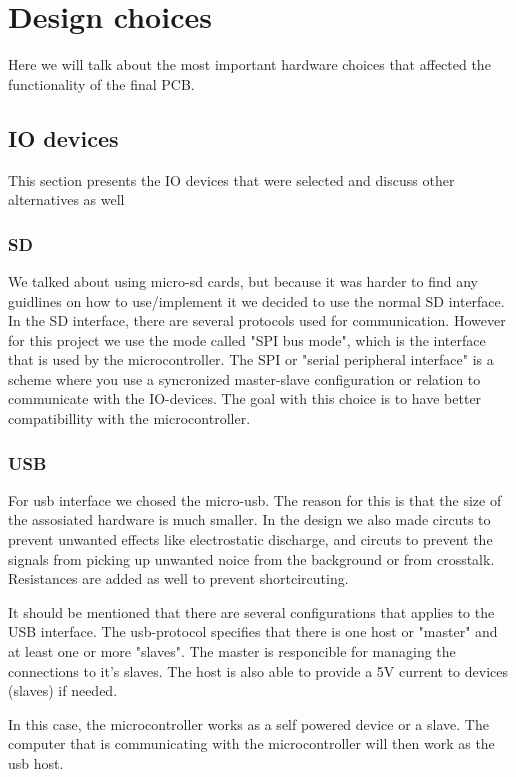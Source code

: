 \section {Design choices}

Here we will talk about the most important hardware choices that affected the functionality of the final PCB.

\subsection{IO devices} \label{pcb:design-choices:ss:IO_devices}
This section presents the IO devices that were selected and discuss other alternatives as well

\subsubsection{SD}
We talked about using micro-sd cards, but because it was harder to find any guidlines on how to use/implement it we decided to use the normal SD interface.
In the SD interface, there are several protocols used for communication. 
However for this project we use the mode called "SPI bus mode", which is the interface that is used by the microcontroller.  
The SPI or "serial peripheral interface" is a scheme where you use a syncronized master-slave configuration or relation to communicate with the IO-devices. 
The goal with this choice is to have better compatibillity with the microcontroller.

\subsubsection{USB}
For usb interface we chosed the micro-usb. 
The reason for this is that the size of the assosiated hardware is much smaller.
In the design we also made circuts to prevent unwanted effects like electrostatic discharge, and circuts to prevent the signals from picking up unwanted noice from the background or from crosstalk.
Resistances are added as well to prevent shortcircuting.

It should be mentioned that there are several configurations that applies to the USB interface. The usb-protocol
specifies that there is one host or "master" and at least one or more "slaves". The master is responcible for managing the connections
to it's slaves. The host is also able to provide a 5V current to devices (slaves) if needed.

In this case, the microcontroller works as a self powered device or a slave. The computer that is communicating with the microcontroller
will then work as the usb host.



